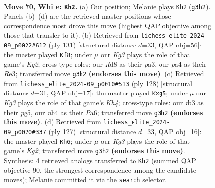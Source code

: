\documentclass[11pt]{article}
\begin{document}
\clearpage

\begin{figure}[p]\centering
\begin{subfigure}{0.46\textwidth}\centering
\resizebox{\linewidth}{!}{%
\newchessgame
\chessboard[
  setfen={3R4/1p2R2p/1k4pP/5p2/pn3P2/1r4K1/8/8 w - - 4 70},
  showmover=false,
  pgfstyle=straightmove, color=movearrow, markmove={g3-h2}
]}
\caption{}
\end{subfigure}\hfill
\begin{subfigure}{0.46\textwidth}\centering
\resizebox{\linewidth}{!}{%
\newchessgame
\chessboard[
  setfen={8/2R3k1/5pp1/6Pp/7P/P3r3/1P6/2K5 b - - 1 66},
  showmover=false,
  pgfstyle=straightmove, color=movearrow, markmove={g7-f8}
]}
\caption{}
\end{subfigure}
\\[4pt]
\begin{subfigure}{0.46\textwidth}\centering
\resizebox{\linewidth}{!}{%
\newchessgame
\chessboard[
  setfen={R1n5/2r5/P7/2p3pP/1p3p1K/1k1P1P2/8/8 w - - 0 65},
  showmover=false,
  pgfstyle=straightmove, color=movearrow, markmove={h4-g5}
]}
\caption{}
\end{subfigure}\hfill
\begin{subfigure}{0.46\textwidth}\centering
\resizebox{\linewidth}{!}{%
\newchessgame
\chessboard[
  setfen={8/5Rk1/4P1p1/3p4/P4PK1/1P6/4r3/8 b - - 0 64},
  showmover=false,
  pgfstyle=straightmove, color=movearrow, markmove={g7-h6}
]}
\caption{}
\end{subfigure}
\caption{\textbf{Move 70, White: \texttt{Kh2}.} (a) Our position; Melanie plays \texttt{Kh2} (\texttt{g3h2}). Panels (b)--(d) are the retrieved master positions whose correspondence most drove this move (highest QAP objective among those that transfer to it). (b) Retrieved from \texttt{lichess\_elite\_2024-09\_p0022\#612} (ply 131) [structural distance $d$=33, QAP obj=56]: the master played \texttt{Kf8}; under $\mu$ our \emph{Kg3} plays the role of that game's \emph{Kg2}; cross-type roles: our \emph{R}d8 as their \emph{p}a3, our \emph{p}a4 as their \emph{R}e3; transferred move \texttt{g3h2} \textbf{(endorses this move)}. (c) Retrieved from \texttt{lichess\_elite\_2024-09\_p0010\#513} (ply 128) [structural distance $d$=31, QAP obj=17]: the master played \texttt{Kxg5}; under $\mu$ our \emph{Kg3} plays the role of that game's \emph{Kh4}; cross-type roles: our \emph{r}b3 as their \emph{p}g5, our \emph{n}b4 as their \emph{P}a6; transferred move \texttt{g3h2} \textbf{(endorses this move)}. (d) Retrieved from \texttt{lichess\_elite\_2024-09\_p0020\#337} (ply 127) [structural distance $d$=33, QAP obj=16]: the master played \texttt{Kh6}; under $\mu$ our \emph{Kg3} plays the role of that game's \emph{Kg2}; transferred move \texttt{g3h2} \textbf{(endorses this move)}. Synthesis: 4 retrieved analogs transferred to \texttt{Kh2} (summed QAP objective 90, the strongest correspondence among the candidate moves); Melanie committed it via the \texttt{search} selector.}
\label{fig:thought-m138}
\end{figure}
\end{document}
